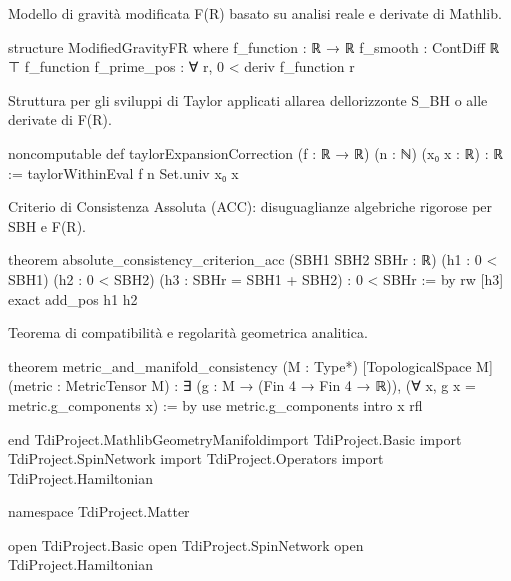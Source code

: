 \documentclass{article}
\newenvironment{Shaded}{%
  \begin{snugshade}%
}{%
  \end{snugshade}%
}%
\newenvironment{Highlighting}{%
}{%
}%
\newcommand{\NormalTok}[1]{#1}
\begin{document}
Modello di gravità modificata F(R) basato su analisi reale e derivate di
Mathlib.

\begin{Shaded}
\begin{Highlighting}[]
\NormalTok{structure ModifiedGravityFR where}
\NormalTok{  f\_function : ℝ → ℝ}
\NormalTok{  f\_smooth : ContDiff ℝ ⊤ f\_function}
\NormalTok{  f\_prime\_pos : ∀ r, 0 \textless{} deriv f\_function r}

\end{Highlighting}
\end{Shaded}

Struttura per gli sviluppi di Taylor applicati all\textquotesingle area
dell\textquotesingle orizzonte S\_BH o alle derivate di F(R).

\begin{Shaded}
\begin{Highlighting}[]
\NormalTok{noncomputable def taylorExpansionCorrection (f : ℝ → ℝ) (n : ℕ) (x₀ x : ℝ) : ℝ :=}
\NormalTok{  taylorWithinEval f n Set.univ x₀ x}

\end{Highlighting}
\end{Shaded}

Criterio di Consistenza Assoluta (ACC): disuguaglianze algebriche
rigorose per SBH e F(R).

\begin{Shaded}
\begin{Highlighting}[]
\NormalTok{theorem absolute\_consistency\_criterion\_acc }
\NormalTok{    (SBH1 SBH2 SBHr : ℝ) (h1 : 0 \textless{} SBH1) (h2 : 0 \textless{} SBH2) (h3 : SBHr = SBH1 + SBH2) :}
\NormalTok{    0 \textless{} SBHr := by}
\NormalTok{  rw [h3]}
\NormalTok{  exact add\_pos h1 h2}

\end{Highlighting}
\end{Shaded}

Teorema di compatibilità e regolarità geometrica analitica.

\begin{Shaded}
\begin{Highlighting}[]
\NormalTok{theorem metric\_and\_manifold\_consistency (M : Type*) [TopologicalSpace M] (metric : MetricTensor M) :}
\NormalTok{    ∃ (g : M → (Fin 4 → Fin 4 → ℝ)), (∀ x, g x = metric.g\_components x) := by}
\NormalTok{  use metric.g\_components}
\NormalTok{  intro x}
\NormalTok{  rfl}

\NormalTok{end TdiProject.MathlibGeometryManifoldimport TdiProject.Basic}
\NormalTok{import TdiProject.SpinNetwork}
\NormalTok{import TdiProject.Operators}
\NormalTok{import TdiProject.Hamiltonian}

\NormalTok{namespace TdiProject.Matter}

\NormalTok{open TdiProject.Basic}
\NormalTok{open TdiProject.SpinNetwork}
\NormalTok{open TdiProject.Hamiltonian}

\end{Highlighting}
\end{Shaded}
\end{document}
